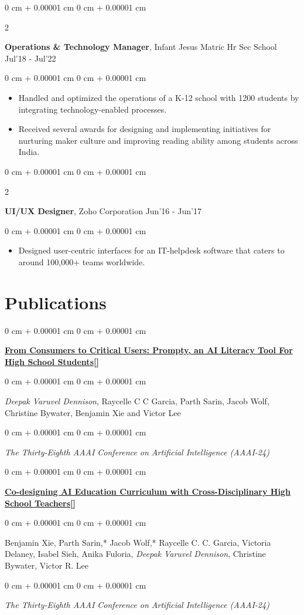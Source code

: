 \documentclass[10pt, letterpaper]{article}
\newenvironment{highlights}{
    \begin{itemize}[
        topsep=0.10 cm,
        parsep=0.10 cm,
        partopsep=0pt,
        itemsep=0pt,
        leftmargin=0 cm + 10pt
    ]
}{
    \end{itemize}
} %
\newenvironment{onecolentry}{
    \begin{adjustwidth}{
        0 cm + 0.00001 cm
    }{
        0 cm + 0.00001 cm
    }
}{
    \end{adjustwidth}
} %
\newenvironment{twocolentry}[2][]{
    \onecolentry
    \def\secondColumn{#2}
    \setcolumnwidth{\fill, 4.5 cm}
    \begin{paracol}{2}
}{
    \switchcolumn \raggedleft \secondColumn
    \end{paracol}
    \endonecolentry
} %
\newcommand{\datetext}[1]{\color{gray800}#1}
\newcommand{\experienceentry}[3]{
    \begin{twocolentry}{
        \datetext{#3}
    }
        \textbf{#1}, #2\end{twocolentry}

    \vspace{0.10 cm}
}
\newcommand{\publicationentry}[4]{
    \begin{onecolentry}
        \textbf{\href{#4}{#1[\coloredLinkIcon]}}
    \end{onecolentry}
    \vspace{0.12 cm}
    \begin{onecolentry}
        #2
    \end{onecolentry}
    \vspace{0.12 cm}
    \begin{onecolentry}
        \textit{#3}
    \end{onecolentry}
}
\newcommand{\coloredLinkIcon}[1]{\textcolor{linkIconColor}{\faIcon{link}}#1}
\newcommand{\itemspacing}[1]{\vspace{0.275 cm}#1}
\newcommand{\publicationspacing}[1]{\vspace{0.35 cm}#1}
\begin{document}
        \itemspacing

        \experienceentry{Operations \& Technology Manager}{Infant Jesus Matric Hr Sec School}{Jul'18 - Jul'22}
        \begin{onecolentry}
            \begin{highlights}
                \item Handled and optimized the operations of a K-12 school with 1200 students by integrating technology-enabled processes.
                \item Received several awards for designing and implementing initiatives for nurturing maker culture and improving reading ability among students across India. 
            \end{highlights}
        \end{onecolentry}
        
        \itemspacing
        
        \experienceentry{UI/UX Designer}{Zoho Corporation}{Jun'16 - Jun'17}
        \begin{onecolentry}
            \begin{highlights}
                \item Designed user-centric interfaces for an IT-helpdesk software that caters to around 100,000+ teams worldwide.
            \end{highlights}
        \end{onecolentry}

    
    \section{Publications}
        \publicationentry
        {From Consumers to Critical Users: Prompty, an AI Literacy Tool For High School Students}
        {\emph{Deepak Varuvel Dennison}, Raycelle C C Garcia, Parth Sarin, Jacob Wolf, Christine Bywater, Benjamin Xie and Victor Lee}
        {The Thirty-Eighth AAAI Conference on Artificial Intelligence (AAAI-24)}
        {https://doi.org/10.1609/aaai.v38i21.30378}

        \publicationspacing

        \publicationentry
        {Co-designing AI Education Curriculum with Cross-Disciplinary High School Teachers}
        {Benjamin Xie, Parth Sarin,* Jacob Wolf,* Raycelle C. C. Garcia, Victoria Delaney, Isabel Sieh, Anika Fuloria, \emph{Deepak Varuvel Dennison}, Christine Bywater, Victor R. Lee}
        {The Thirty-Eighth AAAI Conference on Artificial Intelligence (AAAI-24)}
        {https://doi.org/10.1609/aaai.v38i21.30360}
\end{document}
